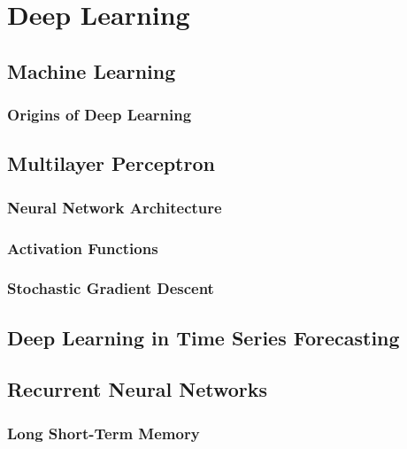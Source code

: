\chapter{Deep Learning}
\label{sec:orgfe36ad5}

\section{Machine Learning}
\label{sec:orgca0af4d}

\subsection{Origins of Deep Learning}
\label{sec:orgca031f3}

\section{Multilayer Perceptron}
\label{sec:orgfb92f8e}

\subsection{Neural Network Architecture}
\label{sec:org04da68b}

\subsection{Activation Functions}
\label{sec:org52867df}

\subsection{Stochastic Gradient Descent}
\label{sec:org52d17df}

\section{Deep Learning in Time Series Forecasting}
\label{sec:org7867582}

\section{Recurrent Neural Networks}
\label{sec:org5fb1b00}

\subsection{Long Short-Term Memory}
\label{sec:orgf7aa310}

